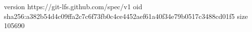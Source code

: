 version https://git-lfs.github.com/spec/v1
oid sha256:a382b54d4c09ffa2c7c6f73fb0c4ce4452aef61a40f34e79b0517c3488cd01f5
size 105690
